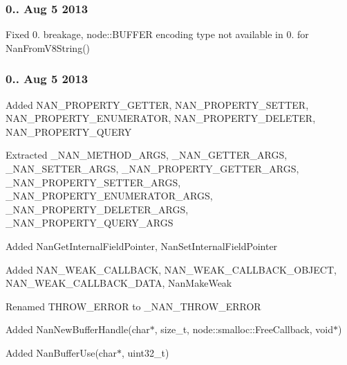 \subsubsection*{0.. Aug 5 2013}


\begin{DoxyItemize}
\item Fixed 0. breakage, node\+::\+B\+U\+F\+F\+ER encoding type not available in 0. for Nan\+From\+V8\+String()
\end{DoxyItemize}

\subsubsection*{0.. Aug 5 2013}


\begin{DoxyItemize}
\item Added N\+A\+N\+\_\+\+P\+R\+O\+P\+E\+R\+T\+Y\+\_\+\+G\+E\+T\+T\+ER, N\+A\+N\+\_\+\+P\+R\+O\+P\+E\+R\+T\+Y\+\_\+\+S\+E\+T\+T\+ER, N\+A\+N\+\_\+\+P\+R\+O\+P\+E\+R\+T\+Y\+\_\+\+E\+N\+U\+M\+E\+R\+A\+T\+OR, N\+A\+N\+\_\+\+P\+R\+O\+P\+E\+R\+T\+Y\+\_\+\+D\+E\+L\+E\+T\+ER, N\+A\+N\+\_\+\+P\+R\+O\+P\+E\+R\+T\+Y\+\_\+\+Q\+U\+E\+RY
\item Extracted \+\_\+\+N\+A\+N\+\_\+\+M\+E\+T\+H\+O\+D\+\_\+\+A\+R\+GS, \+\_\+\+N\+A\+N\+\_\+\+G\+E\+T\+T\+E\+R\+\_\+\+A\+R\+GS, \+\_\+\+N\+A\+N\+\_\+\+S\+E\+T\+T\+E\+R\+\_\+\+A\+R\+GS, \+\_\+\+N\+A\+N\+\_\+\+P\+R\+O\+P\+E\+R\+T\+Y\+\_\+\+G\+E\+T\+T\+E\+R\+\_\+\+A\+R\+GS, \+\_\+\+N\+A\+N\+\_\+\+P\+R\+O\+P\+E\+R\+T\+Y\+\_\+\+S\+E\+T\+T\+E\+R\+\_\+\+A\+R\+GS, \+\_\+\+N\+A\+N\+\_\+\+P\+R\+O\+P\+E\+R\+T\+Y\+\_\+\+E\+N\+U\+M\+E\+R\+A\+T\+O\+R\+\_\+\+A\+R\+GS, \+\_\+\+N\+A\+N\+\_\+\+P\+R\+O\+P\+E\+R\+T\+Y\+\_\+\+D\+E\+L\+E\+T\+E\+R\+\_\+\+A\+R\+GS, \+\_\+\+N\+A\+N\+\_\+\+P\+R\+O\+P\+E\+R\+T\+Y\+\_\+\+Q\+U\+E\+R\+Y\+\_\+\+A\+R\+GS
\item Added Nan\+Get\+Internal\+Field\+Pointer, Nan\+Set\+Internal\+Field\+Pointer
\item Added N\+A\+N\+\_\+\+W\+E\+A\+K\+\_\+\+C\+A\+L\+L\+B\+A\+CK, N\+A\+N\+\_\+\+W\+E\+A\+K\+\_\+\+C\+A\+L\+L\+B\+A\+C\+K\+\_\+\+O\+B\+J\+E\+CT, N\+A\+N\+\_\+\+W\+E\+A\+K\+\_\+\+C\+A\+L\+L\+B\+A\+C\+K\+\_\+\+D\+A\+TA, Nan\+Make\+Weak
\item Renamed T\+H\+R\+O\+W\+\_\+\+E\+R\+R\+OR to \+\_\+\+N\+A\+N\+\_\+\+T\+H\+R\+O\+W\+\_\+\+E\+R\+R\+OR
\item Added Nan\+New\+Buffer\+Handle(char$\ast$, size\+\_\+t, node\+::smalloc\+::\+Free\+Callback, void$\ast$)
\item Added Nan\+Buffer\+Use(char$\ast$, uint32\+\_\+t)

\end{DoxyItemize}
